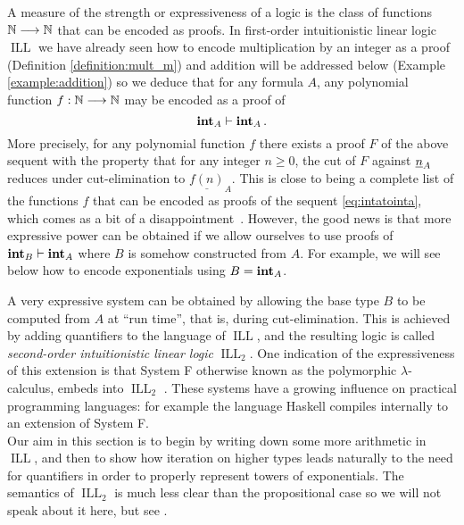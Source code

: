 \documentclass[english,letter paper,12pt,reqno]{article}
\theoremstyle{example}
\DeclareMathOperator{\ILL}{ILL}
\def\inta{\bold{int}}
\begin{document}
A measure of the strength or expressiveness of a logic is the class of functions $\mathbb{N} \longrightarrow \mathbb{N}$ that can be encoded as proofs. In first-order intuitionistic linear logic $\ILL$ we have already seen how to encode multiplication by an integer as a proof (Definition \ref{definition:mult_m}) and addition will be addressed below (Example \ref{example:addition}) so we deduce that for any formula $A$, any polynomial function $f: \mathbb{N} \longrightarrow \mathbb{N}$ may be encoded as a proof of
\begin{equation}\label{eq:intatointa}
\inta_A \vdash \inta_A\,.
\end{equation}
More precisely, for any polynomial function $f$ there exists a proof $F$ of the above sequent with the property that for any integer $n \ge 0$, the cut of $F$ against $\underline{n}_A$ reduces under cut-elimination to $\underline{f(n)}_A$. This is close to being a complete list of the functions $f$ that can be encoded as proofs of the sequent \eqref{eq:intatointa}, which comes as a bit of a disappointment~\cite{schwicht}. However, the good news is that more expressive power can be obtained if we allow ourselves to use proofs of $\inta_B \vdash \inta_A$ where $B$ is somehow constructed from $A$. For example, we will see below how to encode exponentials using $B = \inta_A$. 

A very expressive system can be obtained by allowing the base type $B$ to be computed from $A$ at ``run time'', that is, during cut-elimination. This is achieved by adding quantifiers to the language of $\ILL$, and the resulting logic is called \emph{second-order intuitionistic linear logic} $\ILL_2$. One indication of the expressiveness of this extension is that System F \cite[\S 11]{girard_prooftypes} otherwise known as the polymorphic $\lambda$-calculus, embeds into $\ILL_2$ \cite[\S 5.2]{girard_llogic}. These systems have a growing influence on practical programming languages: for example the language Haskell compiles internally to an extension of System F. 
\\


Our aim in this section is to begin by writing down some more arithmetic in $\ILL$, and then to show how iteration on higher types leads naturally to the need for quantifiers in order to properly represent towers of exponentials. The semantics of $\ILL_2$ is much less clear than the propositional case so we will not speak about it here, but see \cite{girard_systemf,seely_systemf, seely}.
\end{document}
